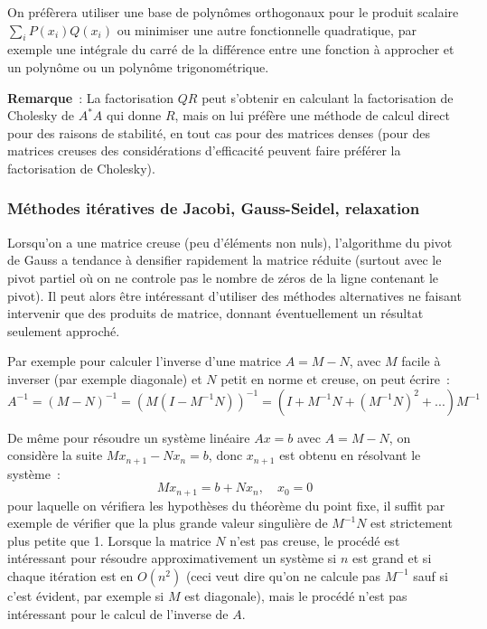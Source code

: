 \documentclass[a4paper,11pt]{article}
\begin{document}
\begin{giacjshere}
On pr\'ef\`erera utiliser une base de polyn\^omes orthogonaux pour
le produit scalaire $\sum_i P(x_i)Q(x_i)$
ou minimiser une autre fonctionnelle quadratique, par
exemple une int\'egrale du carr\'e de la diff\'erence entre une
fonction \`a approcher et un polyn\^ome ou un
polyn\^ome trigonom\'etrique.

{\bf Remarque}~: La factorisation $QR$ peut s'obtenir
en calculant la factorisation de Cholesky de $A^* A$ qui donne $R$,
mais on lui pr\'ef\`ere une m\'ethode de calcul direct pour des
raisons de stabilit\'e, en tout cas pour des matrices denses (pour des
matrices creuses des consid\'erations d'efficacit\'e peuvent faire
pr\'ef\'erer la factorisation de Cholesky).
 
\subsubsection{M\'ethodes it\'eratives de
Jacobi, Gauss-Seidel, relaxation} 
\label{sec:jacobi}
Lorsqu'on a une matrice creuse (peu d'\'el\'ements non nuls),
l'algorithme du pivot de Gauss a tendance \`a densifier rapidement
la matrice r\'eduite (surtout avec le pivot partiel o\`u on ne
controle pas le nombre de z\'eros de la ligne contenant le pivot). Il
peut alors \^etre int\'eressant d'utiliser des m\'ethodes alternatives
ne faisant intervenir que des produits de matrice, donnant \'eventuellement
un r\'esultat seulement approch\'e. 

Par exemple pour calculer
l'inverse d'une matrice $A=M-N$, avec $M$ facile \`a inverser (par
exemple diagonale) et 
$N$ petit en norme et creuse, on peut \'ecrire~:
$$ A^{-1}=(M-N)^{-1} =
(M(I-M^{-1}N))^{-1}=(I+M^{-1}N+(M^{-1}N)^2+...)M^{-1}$$

De m\^eme pour r\'esoudre un syst\`eme lin\'eaire $Ax=b$
avec $A=M-N$,
on consid\`ere la suite $Mx_{n+1}-Nx_n=b$, donc $x_{n+1}$ est obtenu
en r\'esolvant le syst\`eme~:
$$ Mx_{n+1}=b+N x_n, \quad x_0=0$$
pour laquelle on v\'erifiera les hypoth\`eses du th\'eor\`eme du point
fixe, il suffit par exemple de v\'erifier que la plus
grande valeur singuli\`ere de $M^{-1}N$ est strictement plus petite que 1.
Lorsque la matrice $N$ n'est pas creuse, le proc\'ed\'e est int\'eressant
pour r\'esoudre approximativement un syst\`eme si $n$ est grand
et si chaque it\'eration est en $O(n^2)$ (ceci veut
dire qu'on ne calcule pas $M^{-1}$ sauf si c'est
\'evident, par exemple si $M$ est diagonale), 
mais le proc\'ed\'e n'est pas int\'eressant pour le calcul de
l'inverse de $A$.
 

\end{giacjshere}
\end{document}

